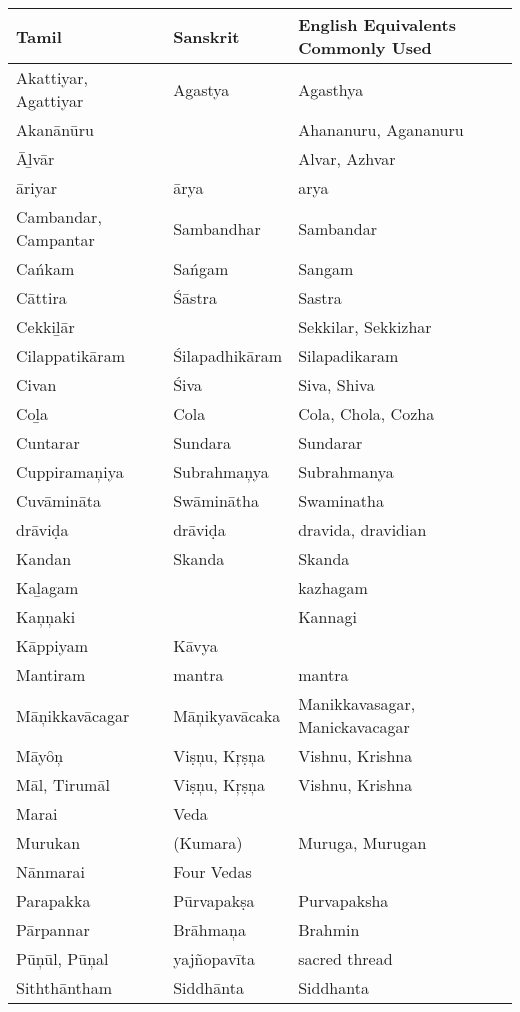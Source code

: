 \begin{longtable}{|l|l|l|}
\hline
Tamil & Sanskrit & English Equivalents Commonly Used \\
\hline
Akattiyar, Agattiyar & Agastya & Agasthya \\
\hline
Akanānūru &  & Ahananuru, Agananuru \\
\hline
Āḻvār &  & Alvar, Azhvar \\
\hline
āriyar & ārya & arya \\
\hline
Cambandar, Campantar & Sambandhar & Sambandar \\
\hline
Cańkam & Sańgam & Sangam \\
\hline
Cāttira & Śāstra & Sastra \\
\hline
Cekkiḻār &  & Sekkilar, Sekkizhar \\
\hline
Cilappatikāram & Śilapadhikāram & Silapadikaram \\
\hline
Civan & Śiva & Siva, Shiva \\
\hline
Coḻa & Cola & Cola, Chola, Cozha \\
\hline
Cuntarar & Sundara & Sundarar \\
\hline
Cuppiramaņiya & Subrahmaņya & Subrahmanya \\
\hline
Cuvāmināta & Swāminātha & Swaminatha \\
\hline
drāviḍa & drāviḍa & dravida, dravidian \\
\hline
Kandan & Skanda & Skanda \\
\hline
Kaḻagam &  & kazhagam \\
\hline
Kaņņaki &  & Kannagi \\
\hline
Kāppiyam & Kāvya &  \\
\hline
Mantiram & mantra & mantra \\
\hline
Māņikkavācagar & Māņikyavācaka & Manikkavasagar, Manickavacagar \\
\hline
Māyȏņ & Viṣņu, Kŗṣņa & Vishnu, Krishna \\
\hline
Māl, Tirumāl & Viṣņu, Kŗṣņa & Vishnu, Krishna \\
\hline
Marai & Veda &  \\
\hline
Murukan & (Kumara) & Muruga, Murugan \\
\hline
Nānmarai & Four Vedas &  \\
\hline
Parapakka & Pūrvapakṣa & Purvapaksha \\
\hline
Pārpannar & Brāhmaņa & Brahmin \\
\hline
Pūņūl, Pūņal & yajñopavīta & sacred thread \\
\hline
Siththāntham & Siddhānta & Siddhanta \\

\end{longtable}
